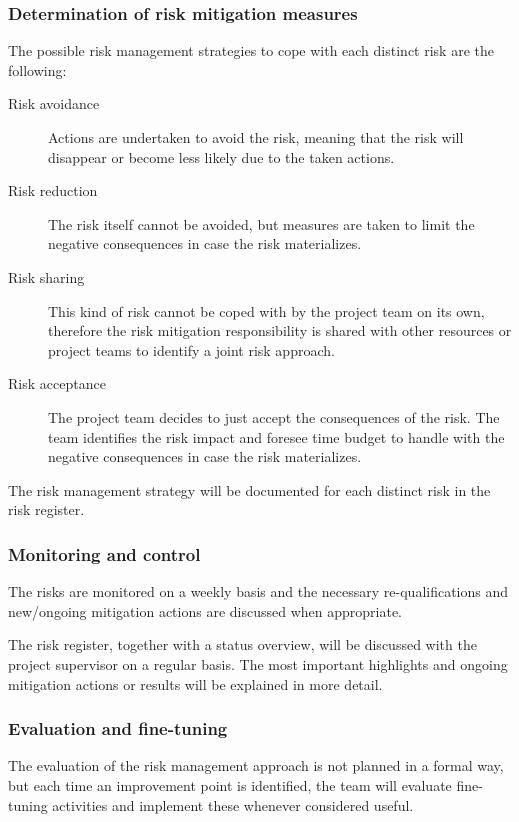 \subsubsection{Determination of risk mitigation measures}
The possible risk management strategies to cope with each distinct risk are the following:
\begin{description}
    \item [Risk avoidance]
    Actions are undertaken to avoid the risk, meaning that the risk will disappear or become less likely due to the taken actions.
    \item[Risk reduction]
    The risk itself cannot be avoided, but measures are taken to limit the negative consequences in case the risk materializes.
    \item[Risk sharing]
    This kind of risk cannot be coped with by the project team on its own, therefore the risk mitigation responsibility is shared with other resources or project teams to identify a joint risk approach.
    \item[Risk acceptance]
    The project team decides to just accept the consequences of the risk.
    The team identifies the risk impact and foresee time budget to handle with the negative consequences in case the risk materializes.
\end {description}

\noindent
The risk management strategy will be documented for each distinct risk in the risk register.

\subsubsection{Monitoring and control}
The risks are monitored on a weekly basis and the necessary re-qualifications and new/ongoing mitigation actions are discussed when appropriate.

The risk register, together with a status overview, will be discussed with the project supervisor on a regular basis.
The most important highlights and ongoing mitigation actions or results will be explained in more detail.

\subsubsection{Evaluation and fine-tuning}
The evaluation of the risk management approach is not planned in a formal way, but each time an improvement point is identified, the team will evaluate fine-tuning activities and implement these whenever considered useful.

